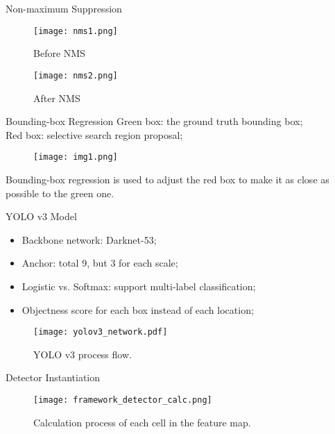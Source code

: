 

\begin{frame}

\end{frame}


\begin{frame}{Non-maximum Suppression}
    \begin{figure}
        \centering
        \texttt{[image: nms1.png]}
        \caption{Before NMS}
    \end{figure}
    
    \begin{figure}
        \centering
        \texttt{[image: nms2.png]}
        \caption{After NMS}
    \end{figure}
\end{frame}

\begin{frame}{Bounding-box Regression}
    Green box: the ground truth bounding box; \\
    Red box: selective search region proposal; \\
    
    \begin{figure}
    \centering
    \texttt{[image: img1.png]}
    \end{figure}
    
    Bounding-box regression is used to adjust the red box to make it as close 
    as possible to the green one.
\end{frame}


\begin{frame}{YOLO v3 Model}
    \begin{itemize}
        \item Backbone network: Darknet-53;
        \item Anchor: total 9, but 3 for each scale;
        \item Logistic vs. Softmax: support multi-label classification;
        \item Objectness score for each box instead of each location;
    \end{itemize}
    \begin{figure}
        \centering
        \texttt{[image: yolov3\_network.pdf]}
        \caption{YOLO v3 process flow.}
    \end{figure}
\end{frame}

\begin{frame}{Detector Instantiation}
    \begin{figure}
        \texttt{[image: framework\_detector\_calc.png]}
        \caption{Calculation process of each cell in the feature map.}
        \label{fig:fw-detector-calc}
    \end{figure}
\end{frame}

